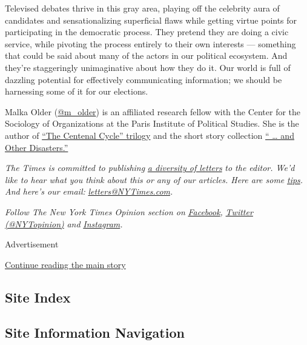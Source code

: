 Televised debates thrive in this gray area, playing off the celebrity
aura of candidates and sensationalizing superficial flaws while getting
virtue points for participating in the democratic process. They pretend
they are doing a civic service, while pivoting the process entirely to
their own interests --- something that could be said about many of the
actors in our political ecosystem. And they're staggeringly
unimaginative about how they do it. Our world is full of dazzling
potential for effectively communicating information; we should be
harnessing some of it for our elections.

Malka Older (\href{https://twitter.com/m_older}{@m\_older}) is an
affiliated research fellow with the Center for the Sociology of
Organizations at the Paris Institute of Political Studies. She is the
author of
\href{https://publishing.tor.com/infomocracy-malkaolder/9780765392367/}{``The
Centenal Cycle'' trilogy} and the short story collection
\href{http://www.masonjarpress.xyz/chapbooks-1/and-other-disasters}{``
\ldots{} and Other Disasters.''}

\emph{The Times is committed to publishing}
\href{https://www.nytimes3xbfgragh.onion/2019/01/31/opinion/letters/letters-to-editor-new-york-times-women.html}{\emph{a
diversity of letters}} \emph{to the editor. We'd like to hear what you
think about this or any of our articles. Here are some}
\href{https://help.nytimes3xbfgragh.onion/hc/en-us/articles/115014925288-How-to-submit-a-letter-to-the-editor}{\emph{tips}}\emph{.
And here's our email:}
\href{mailto:letters@NYTimes.com}{\emph{letters@NYTimes.com}}\emph{.}

\emph{Follow The New York Times Opinion section on}
\href{https://www.facebookcorewwwi.onion/nytopinion}{\emph{Facebook}}\emph{,}
\href{http://twitter.com/NYTOpinion}{\emph{Twitter (@NYTopinion)}}
\emph{and}
\href{https://www.instagram.com/nytopinion/}{\emph{Instagram}}\emph{.}

Advertisement

\protect\hyperlink{after-bottom}{Continue reading the main story}

\hypertarget{site-index}{%
\subsection{Site Index}\label{site-index}}

\hypertarget{site-information-navigation}{%
\subsection{Site Information
Navigation}\label{site-information-navigation}}

